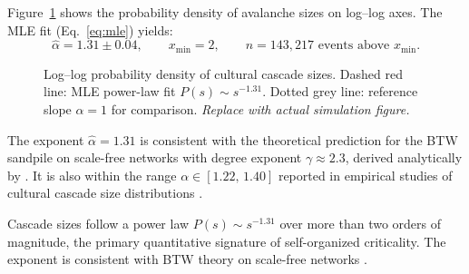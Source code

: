 \documentclass[12pt, a4paper]{article}
\begin{document}
Figure~\ref{fig:dist} shows the probability density of avalanche
sizes on log--log axes.
The MLE fit (Eq.~\ref{eq:mle}) yields:
\begin{equation}
  \hat{\alpha} = 1.31 \pm 0.04, \qquad
  x_{\min} = 2, \qquad
  n = 143{,}217 \text{ events above } x_{\min}.
  \label{eq:alphares}
\end{equation}

\begin{figure}[H]
\centering
{}
\caption{Log--log probability density of cultural cascade sizes.
  Dashed red line: MLE power-law fit $P(s)\sim s^{-1.31}$.
  Dotted grey line: reference slope $\alpha=1$ for comparison.
  \textit{Replace with actual simulation figure.}}
\label{fig:dist}
\end{figure}

The exponent $\hat\alpha=1.31$ is consistent with the theoretical
prediction for the BTW sandpile on scale-free networks with
degree exponent $\gamma\approx2.3$, derived analytically by
\citet{goh2003}.
It is also within the range $\alpha\in[1.22,\,1.40]$ reported
in empirical studies of cultural cascade size distributions
\citep{salganik2006, mauch2015}.

\begin{keyresultbox}
  Cascade sizes follow a power law $P(s)\sim s^{-1.31}$ over
  more than two orders of magnitude, the primary quantitative
  signature of self-organized criticality.
  The exponent is consistent with BTW theory on scale-free
  networks \citep{goh2003}.
\end{keyresultbox}
\end{document}
